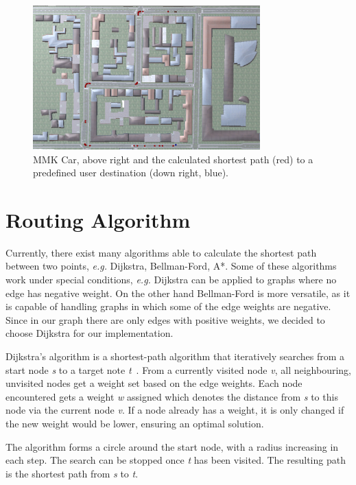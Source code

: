 \begin{figure}[htb]
	\centering
	\includegraphics[width=0.78\textwidth]{figures/nav}
	\caption{MMK Car, above right and the calculated shortest path (red) to a predefined user destination (down right, blue).}
	\label{fig:nav}
\end{figure}

\section{Routing Algorithm}
Currently, there exist many algorithms able to calculate the shortest path between two points, \emph{e.g.} Dijkstra, Bellman-Ford, A*. Some of these algorithms work under special conditions, \emph{e.g.} Dijkstra can be applied to graphs where no edge has negative weight. On the other hand Bellman-Ford is more versatile, as it is capable of handling graphs in which some of the edge weights are negative. Since in our graph there are only edges with positive weights, we decided to choose Dijkstra for our implementation.

Dijkstra's algorithm is a shortest-path algorithm that iteratively searches from a start node \emph{s} to a target note \emph{t}~\cite{skiena1998algorithm}. From a currently visited node \emph{v}, all neighbouring, unvisited nodes get a weight set based on the edge weights. Each node encountered gets a weight \emph{w} assigned which denotes the distance from \emph{s} to this node via the current node \emph{v}. If a node already has a weight, it is only changed if the new weight would be lower, ensuring an optimal solution.

The algorithm forms a circle around the start node, with a radius increasing in each step. The search can be stopped once \emph{t} has been visited. The resulting path is the shortest path from \emph{s} to \emph{t}.

